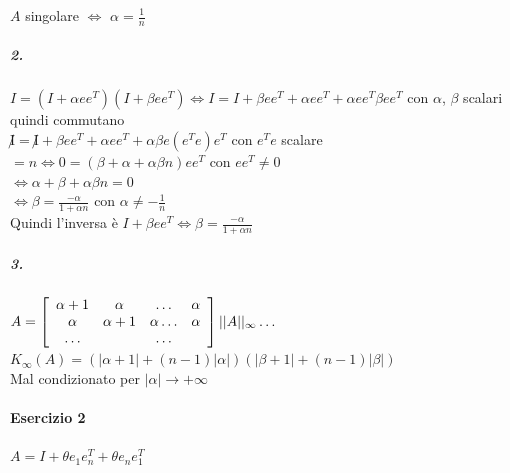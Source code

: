 \documentclass[10pt]{book}
\begin{document}
$A$ singolare $\Leftrightarrow$ $\alpha = \frac{1}{n}$
\subparagraph{2.} $I = (I + \alpha e e^T)(I + \beta e e^T) \Leftrightarrow I = I + \beta e e^T + \alpha e e^T + \alpha e e^T \beta e e^T$ con $\alpha$, $\beta$ scalari quindi commutano\\
$\not I = \not I + \beta e e^T + \alpha e e^T + \alpha \beta e(e^Te)e^T $ con $e^Te$ scalare $= n \Leftrightarrow 0 = (\beta + \alpha + \alpha \beta n)e e^T$ con $e e^T \neq 0$\\
$\Leftrightarrow \alpha + \beta + \alpha \beta n = 0$\\
$\Leftrightarrow \beta = \frac{-\alpha}{1 + \alpha n}$ con $\alpha \neq -\frac{1}{n}$\\
Quindi l'inversa è $I + \beta e e^T \Leftrightarrow \beta = \frac{-\alpha}{1 + \alpha n}$
\subparagraph{3.} $A = \left[\begin{array}{c c c c}
	\alpha + 1 & \alpha & \ldots & \alpha\\
	\alpha & \alpha + 1 & \alpha\ldots & \alpha\\
	\ldots & & \ldots &
\end{array}
\right]
||A||_\infty\ldots$\\
$K_\infty(A) = (|\alpha + 1| + (n - 1)|\alpha|)(|\beta + 1| + (n-1)|\beta|)$\\
Mal condizionato per $|\alpha| \rightarrow +\infty$
\paragraph{Esercizio 2} $A = I + \theta e_1 e_n ^T + \theta e_n e_1^T$
\end{document}
